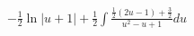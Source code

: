 \documentclass[preview]{standalone}
\begin{document}
\begin{align*}
-\frac{1}{2}\ln|u+1|+\frac{1}{2}\int\frac{\frac{1}{2}(2u-1)+\frac{3}{2}}{u^2-u+1}du
\end{align*}
\end{document}
